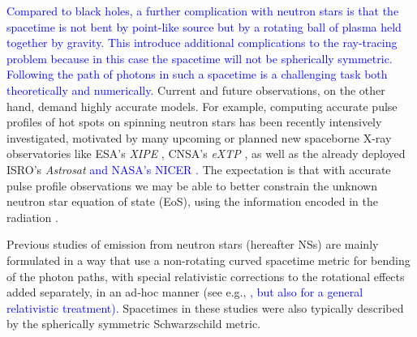\documentclass{aa}
\newcommand{\refe}[1]{\textcolor{blue}{{#1}}}
\newcommand{\refedel}[1]{\textcolor{red}{\sout{#1}}}
\newcommand{\sch}{Schwarzschild }
\begin{document}
\refe{
Compared to black holes, a further complication with neutron stars is that the spacetime is not bent by point-like source but by a rotating ball of plasma held together by gravity.
This introduce additional complications to the ray-tracing problem because in this case the spacetime will not be spherically symmetric.
}
\refe{Following the path of photons in such a spacetime is a challenging task both theoretically and numerically.}
Current and future observations, on the other hand, demand highly accurate models.
For example, computing accurate pulse profiles of hot spots on spinning neutron stars has been recently intensively investigated, motivated by many upcoming or planned new spaceborne X-ray observatories like ESA's \textit{XIPE} \citep{XIPE}, CNSA's \textit{eXTP} \citep{eXTP}, as well as the already deployed ISRO's \textit{Astrosat} \citep{Astrosat} \refe{and NASA's NICER \citep{NICER}.}
The expectation is that with accurate pulse profile observations we may be able to better constrain the unknown neutron star equation of state (EoS), using the information encoded in the radiation \citep[see e.g.,][]{LMB13}.

Previous studies of emission from neutron stars (hereafter NSs) are mainly formulated in a way that use a non-rotating curved spacetime metric for bending of the photon paths, with special relativistic corrections to the rotational effects added separately, in an ad-hoc manner (see e.g.,\refe{ \citealt{PFC83,P95, ML98, WM01, PG03, PB06, Lamb09a, Lamb09b, LMB13, ML15}, but also \citealt{BR01} for a general relativistic treatment). } 
Spacetimes in these studies were also typically described by the spherically symmetric \sch metric.
\end{document}
